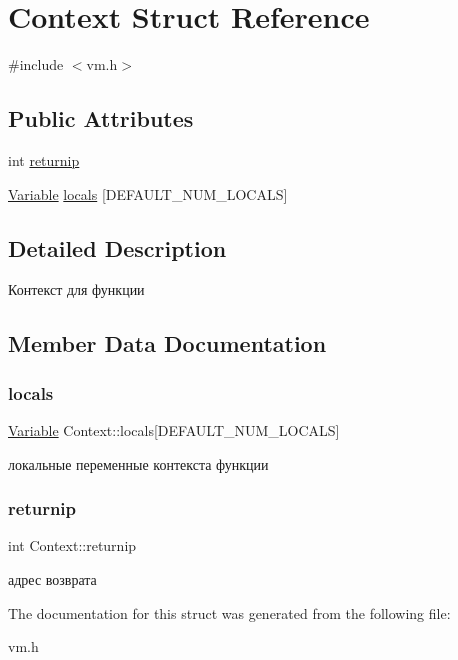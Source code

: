 \hypertarget{struct_context}{}\section{Context Struct Reference}
\label{struct_context}


{\ttfamily \#include $<$vm.\+h$>$}

\subsection*{Public Attributes}
\begin{DoxyCompactItemize}
\item 
int \hyperlink{struct_context_a5459e2352d9678161c460b618fcc02c8}{returnip}
\item 
\hyperlink{union_variable}{Variable} \hyperlink{struct_context_ac8e0c953a1178a0812e680a220bea757}{locals} \mbox{[}D\+E\+F\+A\+U\+L\+T\+\_\+\+N\+U\+M\+\_\+\+L\+O\+C\+A\+LS\mbox{]}
\end{DoxyCompactItemize}


\subsection{Detailed Description}
Контекст для функции 

\subsection{Member Data Documentation}
\mbox{\label{struct_context_ac8e0c953a1178a0812e680a220bea757}} 
\subsubsection{\texorpdfstring{locals}{locals}}
{\footnotesize\ttfamily \hyperlink{union_variable}{Variable} Context\+::locals\mbox{[}D\+E\+F\+A\+U\+L\+T\+\_\+\+N\+U\+M\+\_\+\+L\+O\+C\+A\+LS\mbox{]}}

локальные переменные контекста функции \mbox{\label{struct_context_a5459e2352d9678161c460b618fcc02c8}} 
\subsubsection{\texorpdfstring{returnip}{returnip}}
{\footnotesize\ttfamily int Context\+::returnip}

адрес возврата 

The documentation for this struct was generated from the following file\+:\begin{DoxyCompactItemize}
\item 
vm.\+h\end{DoxyCompactItemize}
